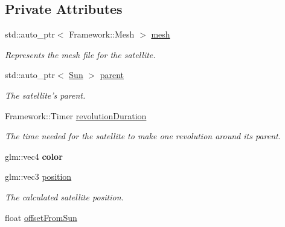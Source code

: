 \subsection*{Private Attributes}
\begin{DoxyCompactItemize}
\item 
\hypertarget{class_satellite_a00e43093535d9107b9c3e5911a78b9e6}{std\-::auto\-\_\-ptr$<$ Framework\-::\-Mesh $>$ \hyperlink{class_satellite_a00e43093535d9107b9c3e5911a78b9e6}{mesh}}\label{class_satellite_a00e43093535d9107b9c3e5911a78b9e6}

\begin{DoxyCompactList}\small\item\em Represents the mesh file for the satellite. \end{DoxyCompactList}\item 
\hypertarget{class_satellite_a4ad51c61fd80af0ae2012156046bc6f1}{std\-::auto\-\_\-ptr$<$ \hyperlink{class_sun}{Sun} $>$ \hyperlink{class_satellite_a4ad51c61fd80af0ae2012156046bc6f1}{parent}}\label{class_satellite_a4ad51c61fd80af0ae2012156046bc6f1}

\begin{DoxyCompactList}\small\item\em The satellite's parent. \end{DoxyCompactList}\item 
\hypertarget{class_satellite_a7e295ead1d57fa33491d544b316b7419}{Framework\-::\-Timer \hyperlink{class_satellite_a7e295ead1d57fa33491d544b316b7419}{revolution\-Duration}}\label{class_satellite_a7e295ead1d57fa33491d544b316b7419}

\begin{DoxyCompactList}\small\item\em The time needed for the satellite to make one revolution around its parent. \end{DoxyCompactList}\item 
\hypertarget{class_satellite_af8a9f6b22d94868c98dbbfb1c926e927}{glm\-::vec4 {\bfseries color}}\label{class_satellite_af8a9f6b22d94868c98dbbfb1c926e927}

\item 
\hypertarget{class_satellite_a924a136220bcab117d5c61781a287df7}{glm\-::vec3 \hyperlink{class_satellite_a924a136220bcab117d5c61781a287df7}{position}}\label{class_satellite_a924a136220bcab117d5c61781a287df7}

\begin{DoxyCompactList}\small\item\em The calculated satellite position. \end{DoxyCompactList}\item 
\hypertarget{class_satellite_a3a9cf936be8fdd647e501b048ef6031f}{float \hyperlink{class_satellite_a3a9cf936be8fdd647e501b048ef6031f}{offset\-From\-Sun}}\label{class_satellite_a3a9cf936be8fdd647e501b048ef6031f}


\end{DoxyCompactItemize}
